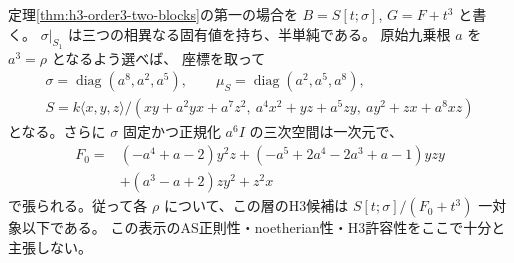 \begin{proposition}
\label{prop:h3-order3-Ore-distinct}
定理\ref{thm:h3-order3-two-blocks}の第一の場合を
$B=S[t;\sigma]$, $G=F+t^3$ と書く。
$\sigma|_{S_1}$ は三つの相異なる固有値を持ち、半単純である。
原始九乗根 $a$ を $a^3=\rho$ となるよう選べば、
座標を取って
\[
\begin{gathered}
 \sigma=\operatorname{diag}(a^8,a^2,a^5),\qquad
 \mu_S=\operatorname{diag}(a^2,a^5,a^8),\\
 S=k\langle x,y,z\rangle/
 (xy+a^2yx+a^7z^2,\ a^4x^2+yz+a^5zy,\ ay^2+zx+a^8xz)
\end{gathered}
\]
となる。さらに $\sigma$ 固定かつ正規化 $a^6 I$ の三次空間は一次元で、
\[
\begin{split}
 F_0={}&(-a^4+a-2)y^2z
       +(-a^5+2a^4-2a^3+a-1)yzy\\
      &+(a^3-a+2)zy^2+z^2x
\end{split}
\]
で張られる。従って各 $\rho$ について、この層のH3候補は
$S[t;\sigma]/(F_0+t^3)$ 一対象以下である。
この表示のAS正則性・noetherian性・H3許容性をここで十分と主張しない。
\end{proposition}
